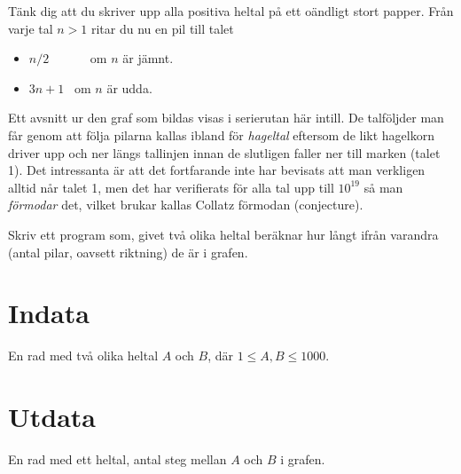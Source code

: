 
\begin{minipage}[t]{0.5\textwidth}
\vspace{0pt}
Tänk dig att du skriver upp alla positiva heltal på ett oändligt stort
papper. Från varje tal $n>1$ ritar du nu en pil till talet
\begin{itemize}
\item $n/2$ \ \ \ \ \ \ om $n$ är jämnt.
\item $3n+1$ \ om $n$ är udda.
\end{itemize}

Ett avsnitt ur den graf som bildas visas i serierutan här intill. De
talföljder man får genom att följa pilarna kallas ibland för {\em hageltal} eftersom de likt
hagelkorn driver upp och ner längs tallinjen innan de slutligen faller
ner till marken (talet 1). Det intressanta är att det fortfarande inte har bevisats att
man verkligen alltid når talet 1, men det har
verifierats för alla tal upp till $10^{19}$ så man {\em förmodar} det, vilket brukar kallas Collatz förmodan (conjecture).

Skriv ett program som, givet två olika heltal beräknar hur långt ifrån varandra (antal pilar,
oavsett riktning) de är i grafen.

\section*{Indata}
En rad med två olika heltal $A$ och $B$, där $1\leq A,B \leq 1000$.

\section*{Utdata}
En rad med ett heltal, antal steg mellan $A$ och $B$ i grafen.
\vfill
\end{minipage}
